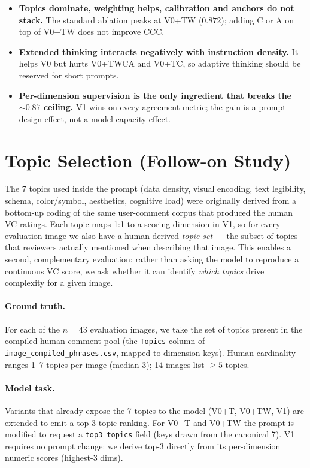 \begin{itemize}
  \item \textbf{Topics dominate, weighting helps, calibration and
    anchors do not stack.} The standard ablation peaks at V0+TW
    ($0.872$); adding C or A on top of V0+TW does not improve CCC.
  \item \textbf{Extended thinking interacts negatively with
    instruction density.} It helps V0 but hurts V0+TWCA and V0+TC,
    so adaptive thinking should be reserved for short prompts.
  \item \textbf{Per-dimension supervision is the only ingredient
    that breaks the $\sim\!0.87$ ceiling.} V1 wins on every
    agreement metric; the gain is a prompt-design effect, not a
    model-capacity effect.
\end{itemize}

\section{Topic Selection (Follow-on Study)}
\label{app:topicsel}

The 7 topics used inside the prompt (data density, visual encoding,
text legibility, schema, color/symbol, aesthetics, cognitive load)
were originally derived from a bottom-up coding of the same
user-comment corpus that produced the human VC ratings. Each topic
maps 1:1 to a scoring dimension in V1, so for every evaluation image
we also have a human-derived \emph{topic set} --- the subset of topics
that reviewers actually mentioned when describing that image. This
enables a second, complementary evaluation: rather than asking the
model to reproduce a continuous VC score, we ask whether it can
identify \emph{which topics} drive complexity for a given image.

\paragraph{Ground truth.} For each of the $n=43$ evaluation images,
we take the set of topics present in the compiled human comment pool
(the \texttt{Topics} column of \texttt{image\_compiled\_phrases.csv},
mapped to dimension keys). Human cardinality ranges 1--7 topics per
image (median 3); 14 images list $\geq 5$ topics.

\paragraph{Model task.} Variants that already expose the 7 topics to
the model (V0+T, V0+TW, V1) are extended to emit a top-3 topic
ranking. For V0+T and V0+TW the prompt is modified to request a
\texttt{top3\_topics} field (keys drawn from the canonical 7). V1
requires no prompt change: we derive top-3 directly from its
per-dimension numeric scores (highest-3 dims).

